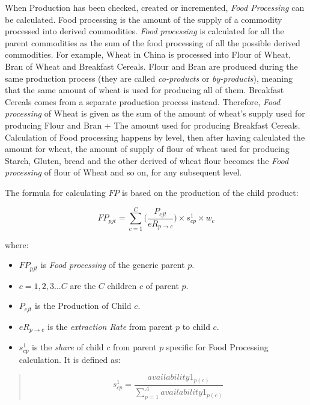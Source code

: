 \documentclass[]{article}
\providecommand{\tightlist}{%
  \setlength{\itemsep}{0pt}\setlength{\parskip}{0pt}}
\begin{document}
When Production has been checked, created or incremented, \emph{Food
Processing} can be calculated. Food processing is the amount of the
supply of a commodity processed into derived commodities. \emph{Food
processing} is calculated for all the parent commodities as the sum of
the food processing of all the possible derived commodities. For
example, Wheat in China is processed into Flour of Wheat, Bran of Wheat
and Breakfast Cereals. Flour and Bran are produced during the same
production process (they are called \emph{co-products} or
\emph{by-products}), meaning that the same amount of wheat is used for
producing all of them. Breakfast Cereals comes from a separate
production process instead. Therefore, \emph{Food processing} of Wheat
is given as the sum of the amount of wheat's supply used for producing
Flour and Bran + The amount used for producing Breakfast Cereals.
Calculation of Food processing happens by level, then after having
calculated the amount for wheat, the amount of supply of flour of wheat
used for producing Starch, Gluten, bread and the other derived of wheat
flour becomes the \emph{Food processing} of flour of Wheat and so on,
for any subsequent level.

The formula for calculating \(FP\) is based on the production of the
child product:

\begin{equation}
\label{eq:Food Processing}
FP_{pjt} = \sum \limits_{c=1}^C\biggl(\frac{P_{cjt}}{eR_{p\to c}}\biggr)\times s^{1}_{cp}\times w_{c}
\end{equation}

where:

\begin{itemize}
\tightlist
\item
  \(FP_{pjt}\) is \emph{Food processing} of the generic parent \(p\).
\item
  \(c = 1,2,3...C\) are the \(C\) children \(c\) of parent \(p\).
\item
  \(P_{cjt}\) is the Production of Child \(c\).
\item
  \(eR_{p\to c}\) is the \emph{extraction Rate} from parent \(p\) to
  child \(c\).
\item
  \(s^{1}_{cp}\) is the \emph{share} of child \(c\) from parent \(p\)
  specific for Food Processing calculation. It is defined as:
\end{itemize}

\begin{quote}
\begin{equation}
\label{eq:shares}
s^{1}_{cp} = \frac{availability1_{p(c)}}{\sum \limits_{p=1}^A{availability1_{p(c)}}}
\end{equation}
\end{quote}
\end{document}
